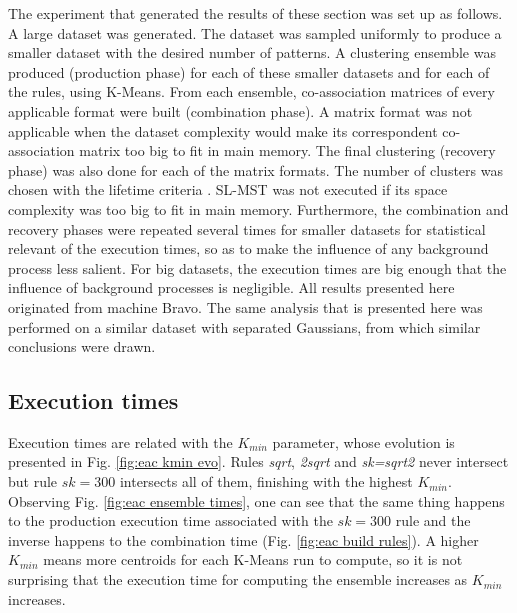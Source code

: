 The experiment that generated the results of these section was set up as follows.
A large dataset was generated.
The dataset was sampled uniformly to produce a smaller dataset with the desired number of patterns.
A clustering ensemble was produced (production phase) for each of these smaller datasets and for each of the rules, using K-Means.
From each ensemble, co-association matrices of every applicable format were built (combination phase).
A matrix format was not applicable when the dataset complexity would make its correspondent co-association matrix too big to fit in main memory.
The final clustering (recovery phase) was also done for each of the matrix formats.
The number of clusters was chosen with the lifetime criteria \cite{Fred2005}.
SL-MST was not executed if its space complexity was too big to fit in main memory.
Furthermore, the combination and recovery phases were repeated several times for smaller datasets for statistical relevant of the execution times, so as to make the influence of any background process less salient.
For big datasets, the execution times are big enough that the influence of background processes is negligible.
All results presented here originated from machine Bravo.
The same analysis that is presented here was performed on a similar dataset with separated Gaussians, from which similar conclusions were drawn.

\subsection{Execution times}

Execution times are related with the $K_{min}$ parameter, whose evolution is presented in Fig. \ref{fig:eac kmin evo}.
Rules \emph{sqrt}, \emph{2sqrt} and \emph{sk=sqrt2} never intersect but rule $sk=300$ intersects all of them, finishing with the highest $K_{min}$.
Observing Fig. \ref{fig:eac ensemble times}, one can see that the same thing happens to the production execution time associated with the $sk=300$ rule and the inverse happens to the combination time (Fig. \ref{fig:eac build rules}).
A higher $K_{min}$ means more centroids for each K-Means run to compute, so it is not surprising that the execution time for computing the ensemble increases as $K_{min}$ increases.


